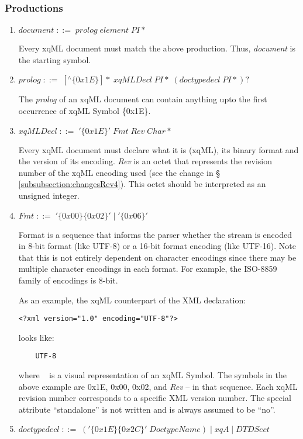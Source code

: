 \subsubsection{Productions}
\begin{enumerate}
\item \label{pr:document} \(document\;::=\;prolog\;element\;PI* \)

Every xqML document must match the above production. Thus,
\textit{document} is the starting symbol.

\item \label{pr:prolog} \(prolog\;::=\;[^\wedge\{0x1E\}]\!*\;xqMLDecl\;PI\!*\;(doctypedecl\;PI*)? \)

The \textit{prolog} of an xqML document can contain anything upto the
first occurrence of xqML Symbol \{0x1E\}.

\item \label{pr:xqMLDecl} \(xqMLDecl\;::=\;'\{0x1E\}'\;Fmt\;Rev\;Char* \)

Every xqML document must declare what it is (xqML), its binary format
and the version of its encoding. {\it Rev} is an octet that represents
the revision number of the xqML encoding used (see the change in \S{}
\ref{subsubsection:changesRev4}). This octet should be interpreted as
an unsigned integer.

\item \label{pr:Fmt} \(Fmt\;::=\;'\{0x00\}\{0x02\}'\;|\;'\{0x06\}' \)

Format is a sequence that informs the parser whether the stream is
encoded in 8-bit format (like UTF-8) or a 16-bit format encoding (like
UTF-16). Note that this is not entirely dependent on character
encodings since there may be multiple character encodings in each
format. For example, the ISO-8859 family of encodings is 8-bit.

As an example, the xqML counterpart of the XML declaration: 
\begin{center} \verb|<?xml version="1.0" encoding="UTF-8"?>| \end{center}
looks like:
\begin{center} \verb*|    UTF-8| \end{center}
where \verb*| | 
is a visual representation of an xqML Symbol. The symbols in the above
example are 0x1E, 0x00, 0x02, and {\it Rev} -- in that sequence.
Each xqML revision number corresponds to a specific XML version
number. The special attribute ``standalone'' is not written and is
always assumed to be ``no''.

\item \label{pr:doctypedecl} \(doctypedecl\;::=\;('\{0x1E\}\{0x2C\}'\;DoctypeName)\;|\;xqA\;|\;DTDSect \)


\end{enumerate}
